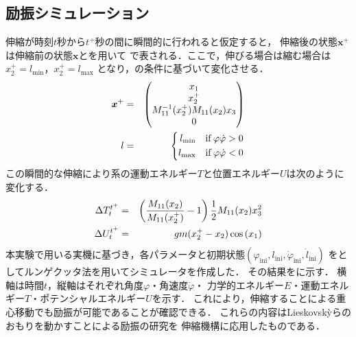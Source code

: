           \subsection{励振シミュレーション}
          伸縮が時刻$t$秒から$t^{+}$秒の間に瞬間的に行われると仮定すると，
          伸縮後の状態$\bm{x}^{+}$は伸縮前の状態$\bm{x}$とを用いて
          で表される．ここで，伸びる場合は縮む場合は$x_2^{+}=l_{\mathrm{min}}$，$x_2^{+}=l_{\mathrm{max}}$
          となり，の条件に基づいて変化させる．
          \begin{eqnarray}
            \equlabel{xx}
            \bm{x}^{+}&=&
            \begin{pmatrix}
                x_1\\
                x_2^{+}\\
                M_{11}^{-1}(x_2^{+})M_{11}(x_2)x_3\\
                0\\
                \end{pmatrix}\\
            \equlabel{l_change}
           l&=& \left\{
              \begin{aligned}
                l_{\mathrm{min}}\quad \mathrm{if}\,\varphi\dot{\varphi}>0\\
                l_{\mathrm{max}}\quad \mathrm{if}\,\varphi\dot{\varphi}<0
              \end{aligned}
            \right.
            \end{eqnarray}
          この瞬間的な伸縮により系の運動エネルギー$T$と位置エネルギー$U$は次のように変化する．
          \begin{eqnarray}
            \equlabel{dT}
            \Delta T_t^{t^{+}}&=&\left(\frac{M_{11}(x_2)}{M_{11}(x_2^{+})}-1\right)\frac{1}{2}M_{11}(x_2)x_3^2\\
            \equlabel{dU}
            \Delta U_t^{t^{+}}&=&gm(x_2^{+}-x_2)\cos{(x_1)}            
            \end{eqnarray}
          本実験で用いる実機に基づき，各パラメータと初期状態$(\varphi_{\mathrm{ini}},l_{\mathrm{ini}},\dot{\varphi}_{\mathrm{ini}},\dot{l}_{\mathrm{ini}})$
          をとしてルンゲクッタ法を用いてシミュレータを作成した．
          その結果をに示す．
          横軸は時間$t$，縦軸はそれぞれ角度$\varphi$・角速度$\dot{\varphi}$・
          力学的エネルギー$E$・運動エネルギー$T$・ポテンシャルエネルギー$U$を示す．
          これにより，伸縮することによる重心移動でも励振が可能であることが確認できる．
          これらの内容はLieskovsk{\`y}らのおもりを動かすことによる励振の研究\cite{lieskovsky2023optimal}を
          伸縮機構に応用したものである．

